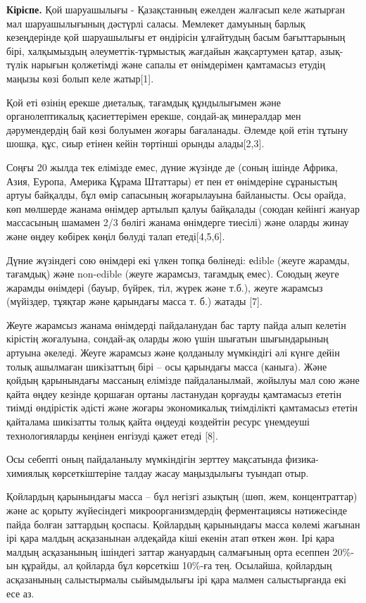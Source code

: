 \begin{multicols}{2}
{\bfseries Кіріспе.} Қой шаруашылығы - Қазақстанның ежелден жалғасып келе
жатырған мал шаруашылығының дәстүрлі саласы. Мемлекет дамуының барлық
кезеңдерінде қой шаруашылығы ет өндірісін ұлғайтудың басым бағыттарының
бірі, халқымыздың әлеуметтік-тұрмыстық жағдайын жақсартумен қатар,
азық-түлік нарығын қолжетімді және сапалы ет өнімдерімен қамтамасыз
етудің маңызы көзі болып келе жатыр{[}1{]}.

Қой еті өзінің ерекше диеталық, тағамдық құндылығымен және
органолептикалық қасиеттерімен ерекше, сондай-ақ минералдар мен
дәрумендердің бай көзі болуымен жоғары бағаланады. Әлемде қой етін
тұтыну шошқа, құс, сиыр етінен кейін төртінші орынды алады{[}2,3{]}.

Соңғы 20 жылда тек елімізде емес, дүние жүзінде де (соның ішінде Африка,
Азия, Еуропа, Америка Құрама Штаттары) ет пен ет өнімдеріне сұраныстың
артуы байқалды, бұл өмір сапасының жоғарылауына байланысты. Осы орайда,
көп мөлшерде жанама өнімдер артылып қалуы байқалады (союдан кейінгі
жануар массасының шамамен 2/3 бөлігі жанама өнімдерге тиесілі) және
оларды жинау және өңдеу көбірек көңіл бөлуді талап етеді{[}4,5,6{]}.

Дүние жүзіндегі сою өнімдері екі үлкен топқа бөлінеді: еdible (жеуге
жарамды, тағамдық) және non-edible (жеуге жарамсыз, тағамдық емес).
Союдың жеуге жарамды өнімдері (бауыр, бүйрек, тіл, жүрек және т.б.),
жеуге жарамсыз (мүйіздер, тұяқтар және қарындағы масса т. б.) жатады
{[}7{]}.

Жеуге жарамсыз жанама өнімдерді пайдаланудан бас тарту пайда алып
келетін кірістің жоғалуына, сондай-ақ оларды жою үшін шығатын
шығындарының артуына әкеледі. Жеуге жарамсыз және қолданылу мүмкіндігі
әлі күнге дейін толық ашылмаған шикізаттың бірі -- осы қарындағы масса
(каныга). Және қойдың қарынындағы массаның елімізде пайдаланылмай,
жойылуы мал сою және қайта өңдеу кезінде қоршаған ортаны ластанудан
қорғауды қамтамасыз ететін тиімді өндірістік әдісті және жоғары
экономикалық тиімділікті қамтамасыз ететін қайталама шикізатты толық
қайта өңдеуді көздейтін ресурс үнемдеуші технологияларды кеңінен
енгізуді қажет етеді {[}8{]}.

Осы себепті оның пайдаланылу мүмкіндігін зерттеу мақсатында
физика-химиялық көрсеткіштеріне талдау жасау маңыздылығы туындап отыр.

Қойлардың қарынындағы масса -- бұл негізгі азықтың (шөп, жем,
концентраттар) және ас қорыту жүйесіндегі микроорганизмдердің
ферментациясы нәтижесінде пайда болған заттардың қоспасы. Қойлардың
қарынындағы масса көлемі жағынан ірі қара малдың асқазанынан әлдеқайда
кіші екенін атап өткен жөн. Ірі қара малдың асқазанының ішіндегі заттар
жануардың салмағының орта есеппен 20\%-ын құрайды, ал қойларда бұл
көрсеткіш 10\%-ға тең. Осылайша, қойлардың асқазанының салыстырмалы
сыйымдылығы ірі қара малмен салыстырғанда екі есе аз.


\end{multicols}
